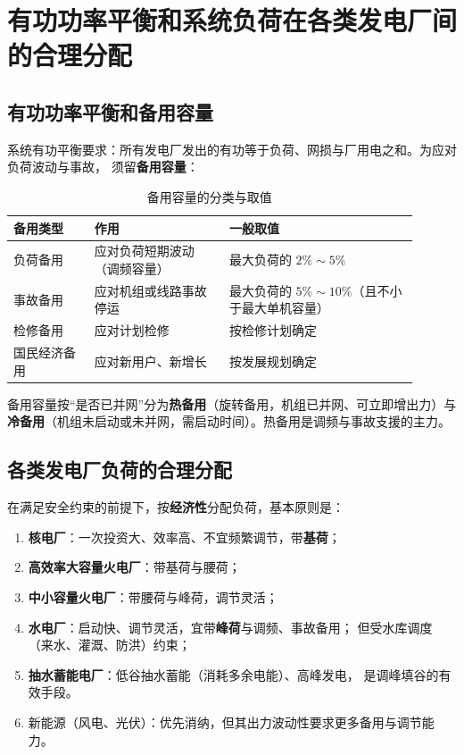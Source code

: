 \section{有功功率平衡和系统负荷在各类发电厂间的合理分配}

\subsection{有功功率平衡和备用容量}

系统有功平衡要求：所有发电厂发出的有功等于负荷、网损与厂用电之和。为应对负荷波动与事故，
须留\textbf{备用容量}：

\begin{table}[htbp]
  \centering
  \caption{备用容量的分类与取值}
  \small
  \begin{tabular}{@{}p{0.18\linewidth}p{0.30\linewidth}p{0.42\linewidth}@{}}
    \toprule
    备用类型 & 作用 & 一般取值 \\
    \midrule
    负荷备用 & 应对负荷短期波动（调频容量） & 最大负荷的 $2\%\sim5\%$ \\
    事故备用 & 应对机组或线路事故停运 & 最大负荷的 $5\%\sim10\%$（且不小于最大单机容量） \\
    检修备用 & 应对计划检修 & 按检修计划确定 \\
    国民经济备用 & 应对新用户、新增长 & 按发展规划确定 \\
    \bottomrule
  \end{tabular}
\end{table}

备用容量按“是否已并网”分为\textbf{热备用}（旋转备用，机组已并网、可立即增出力）与
\textbf{冷备用}（机组未启动或未并网，需启动时间）。热备用是调频与事故支援的主力。

\subsection{各类发电厂负荷的合理分配}

在满足安全约束的前提下，按\textbf{经济性}分配负荷，基本原则是：
\begin{enumerate}
  \item \textbf{核电厂}：一次投资大、效率高、不宜频繁调节，带\textbf{基荷}；
  \item \textbf{高效率大容量火电厂}：带基荷与腰荷；
  \item \textbf{中小容量火电厂}：带腰荷与峰荷，调节灵活；
  \item \textbf{水电厂}：启动快、调节灵活，宜带\textbf{峰荷}与调频、事故备用；
        但受水库调度（来水、灌溉、防洪）约束；
  \item \textbf{抽水蓄能电厂}：低谷抽水蓄能（消耗多余电能）、高峰发电，
        是调峰填谷的有效手段。
  \item 新能源（风电、光伏）：优先消纳，但其出力波动性要求更多备用与调节能力。
\end{enumerate}

